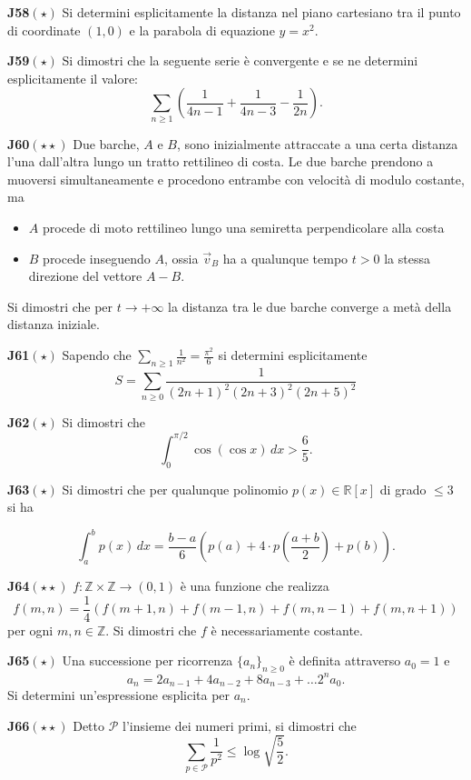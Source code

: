 \documentclass[a4paper,twoside]{article}
\theoremstyle{definition}
\numberwithin{theorem}{section}
\begin{document}
\textbf{J58}$(\star)$ Si determini esplicitamente la distanza nel piano cartesiano tra il punto di coordinate $(1,0)$ e la parabola di equazione $y=x^2$.

\textbf{J59}$(\star)$ Si dimostri che la seguente serie è convergente e se ne determini esplicitamente il valore:
$$\sum_{n\geq 1}\left(\frac{1}{4n-1}+\frac{1}{4n-3}-\frac{1}{2n}\right).$$

\textbf{J60}$(\star\star)$ Due barche, $A$ e $B$, sono inizialmente attraccate a una certa distanza l'una dall'altra lungo un tratto rettilineo di costa. Le due barche prendono a muoversi simultaneamente e procedono entrambe con velocità di modulo costante, ma
\begin{itemize}
\item $A$ procede di moto rettilineo lungo una semiretta perpendicolare alla costa
\item $B$ procede inseguendo $A$, ossia $\vec{v}_B$ ha a qualunque tempo $t>0$ la stessa direzione del vettore $A-B$.
\end{itemize}
Si dimostri che per $t\to +\infty$ la distanza tra le due barche converge a metà della distanza iniziale.  

\textbf{J61}$(\star)$ Sapendo che $\sum_{n\geq 1}\frac{1}{n^2}=\frac{\pi^2}{6}$ si determini esplicitamente
$$ S = \sum_{n\geq 0}\frac{1}{(2n+1)^2 (2n+3)^2 (2n+5)^2} $$

\textbf{J62}$(\star)$ Si dimostri che 
$$ \int_{0}^{\pi/2}\cos(\cos x)\,dx > \frac{6}{5}.$$

\textbf{J63}$(\star)$ Si dimostri che per qualunque polinomio $p(x)\in\mathbb{R}[x]$ di grado $\leq 3$ si ha 

$$ \int_{a}^{b} p(x)\,dx = \frac{b-a}{6}\left(p(a)+4\cdot p\left(\frac{a+b}{2}\right)+p(b)\right). $$

\textbf{J64}$(\star\star)$ $f:\mathbb{Z}\times\mathbb{Z}\to (0,1)$ è una funzione che realizza
$$ f(m,n) = \frac{1}{4}\left(f(m+1,n)+f(m-1,n)+f(m,n-1)+f(m,n+1)\right) $$
per ogni $m,n\in\mathbb{Z}$. Si dimostri che $f$ è necessariamente costante.

\textbf{J65}$(\star)$ Una successione per ricorrenza $\{a_n\}_{n\geq 0}$ è definita attraverso $a_0=1$ e 
$$ a_n = 2 a_{n-1} + 4 a_{n-2} + 8 a_{n-3}+\ldots 2^n a_{0}.$$
Si determini un'espressione esplicita per $a_n$.

\textbf{J66}$(\star\star)$ Detto $\mathcal{P}$ l'insieme dei numeri primi, si dimostri che 
$$ \sum_{p\in\mathcal{P}}\frac{1}{p^2} \leq \log\sqrt{\frac{5}{2}}.$$
\end{document}
